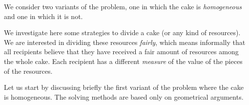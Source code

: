 \medskip

We consider two variants of the problem, one in which the cake is {\em homogeneous} and one in which it is not.


\smallskip



We investigate here some strategies to divide a cake
(or any kind of resources). We are interested in dividing these resources \textit{fairly}, 
which means informally that all recipients believe that they have received a fair amount of resources among the whole cake. 
Each recipient has a different \textit{measure} of the value of the pieces of the resources. 

Let us start by discussing briefly the first variant of the problem where the cake is homogeneous. 
The solving methods are based only on geometrical arguments. 
